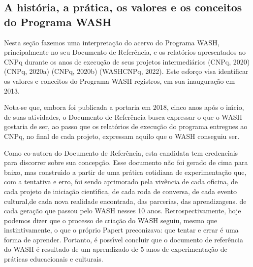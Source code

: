 \documentclass[
12pt,		%
openright,	%
twoside,  %
a4paper,			%
chapter=TITLE,		%
english,			%
french,				%
spanish,			%
brazil				%
]{USPSC-classe/USPSC}
\begin{document}
\subsection[A hist\'oria, a pr\'atica, os valores e os conceitos do Programa WASH]{A hist\'oria, a pr\'atica, os valores e os conceitos do Programa WASH}\label{A hist\'oria, a pr\'atica, os valores e os conceitos do Programa WASH}
Nesta se\c{c}\~ao fazemos uma interpreta\c{c}\~ao do acervo do Programa WASH, principalmente no seu Documento de Refer\^encia, e os relat\'orios apresentados ao CNPq durante os anos de execu\c{c}\~ao de seus projetos intermedi\'arios  (CNPq, 2020)   (CNPq, 2020a)  (CNPq, 2020b)  (WASHCNPq, 2022). Este esfor\c{c}o visa identificar os valores e conceitos do Programa WASH registros, em sua inaugura\c{c}\~ao em 2013.










Nota-se que, embora foi publicada a portaria em 2018, cinco anos ap\'os o in\'{\i}cio, de suas atividades, o Documento de Refer\^encia busca expressar \textquotedbl o que o WASH gostaria de ser\textquotedbl , ao passo que os relat\'orios de execu\c{c}\~ao do programa entregues ao CNPq, no final de cada projeto, expressam \textquotedbl aquilo que o WASH conseguiu ser\textquotedbl .










Como co-autora do Documento de Refer\^encia, esta candidata tem credenciais para discorrer sobre sua concep\c{c}\~ao. Esse documento n\~ao foi gerado de cima para baixo, mas constru\'{\i}do a partir de uma pr\'atica cotidiana de experimenta\c{c}\~ao que, com a \textquotedbl tentativa e erro\textquotedbl , foi sendo aprimorado pela viv\^encia de cada oficina, de cada projeto de inicia\c{c}\~ao cient\'{\i}fica, de cada roda de conversa, de cada  evento cultural,de cada nova realidade encontrada, das parcerias, das aprendizagens. de cada gera\c{c}\~ao que passou pelo WASH nesses 10 anos. Retrospectivamente, hoje podemos dizer que o processo de cria\c{c}\~ao do WASH seguiu, mesmo que instintivamente, o que o pr\'oprio Papert preconizava: que tentar e errar \'e uma forma de aprender. Portanto, \'e poss\'{\i}vel concluir que o documento de refer\^encia do WASH \'e resultado de um aprendizado de 5 anos de experimenta\c{c}\~ao de pr\'aticas educacionais e culturais.
\end{document}
